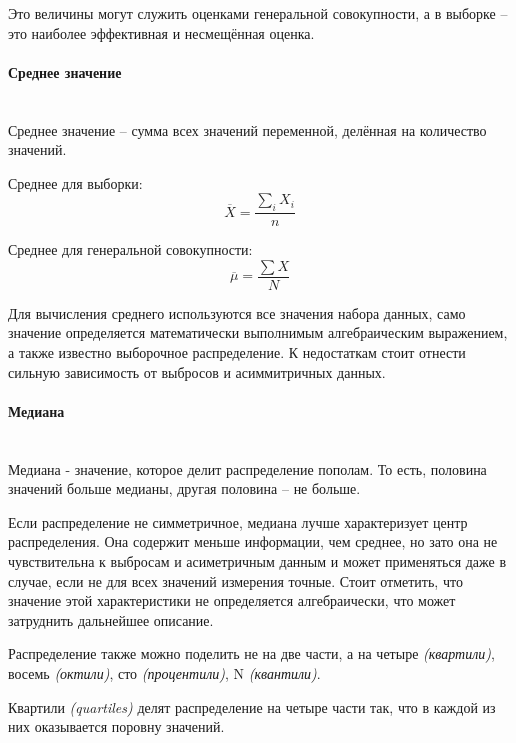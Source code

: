 Это величины могут служить оценками генеральной совокупности, а в выборке -- это наиболее эффективная и несмещённая оценка.

\paragraph*{Среднее значение} \mbox{} \\

Среднее значение -- сумма всех значений переменной, делённая на количество значений. 

Среднее для выборки:
\begin{equation}
	\overline{X} = \frac{\sum\limits_i X_i}{n}
\end{equation}

Среднее для генеральной совокупности:
\begin{equation}
	\overline{\mu} = \frac{\sum X}{N}
\end{equation}

Для вычисления среднего используются все значения набора данных, само значение определяется математически выполнимым алгебраическим выражением, а также известно выборочное распределение. К недостаткам стоит отнести сильную зависимость от выбросов и асиммитричных данных.

\paragraph*{Медиана} \mbox{} \\

Медиана - значение, которое делит распределение пополам. То есть, половина значений больше медианы, другая половина -- не больше.

Если распределение не симметричное, медиана лучше характеризует центр распределения. Она содержит меньше информации, чем среднее, но зато она не чувствительна к выбросам и асиметричным данным и может применяться даже в случае, если не для всех значений измерения точные. Стоит отметить, что значение этой характеристики не определяется алгебраически, что может затруднить дальнейшее описание.

Распределение также можно поделить не на две части, а на четыре \textit{(квартили)}, восемь \textit{(октили)}, сто \textit{(процентили)}, N \textit{(квантили)}.

Квартили \textit{(quartiles)} делят распределение на четыре части так, что в каждой из них оказывается поровну значений.

